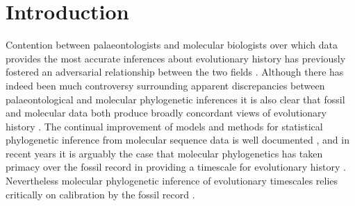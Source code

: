 \documentclass[11pt]{article}
\begin{document}
\section*{Introduction}


Contention between palaeontologists and molecular biologists over which data provides the most accurate inferences about evolutionary history has previously fostered an adversarial relationship between the two fields \cite{Donoghue2007}. 
Although there has indeed been much controversy surrounding apparent discrepancies between palaeontological and molecular phylogenetic inferences \cite{BromhamPenny2003} it is also clear that fossil and molecular data both produce broadly concordant views of evolutionary history \cite{BentonAyala2003}. 
The continual improvement of models and methods for statistical phylogenetic inference from molecular sequence data is well documented \cite{Felsenstein2004,Yang2014}, and in recent years it is arguably the case that molecular phylogenetics has taken primacy over the fossil record in providing a timescale for evolutionary history \cite{Donoghue2007}. 
Nevertheless molecular phylogenetic inference of evolutionary timescales relies critically on calibration by the fossil record \cite{Donoghue2007}.

\end{document}
